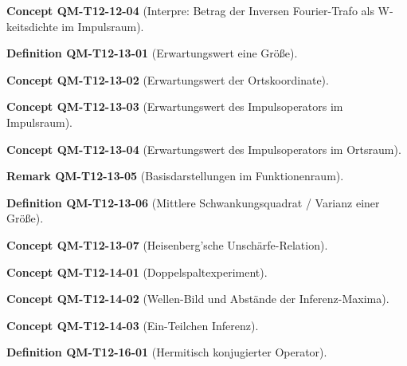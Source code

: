 \documentclass[10pt, letterpaper]{article}
\newcommand{\CustomHeading}[3]{%
  \par\medskip\noindent%
  \textbf{#1 #2} \textnormal{(#3)}.\enskip%
}
\newenvironment{DEF}[2]{\CustomHeading{Definition}{#1}{#2}}{}
\newenvironment{REM}[2]{\CustomHeading{Remark}{#1}{#2}}{}
\newenvironment{CONC}[2]{\CustomHeading{Concept}{#1}{#2}}{}
\begin{document}
\begin{CONC}{QM-T12-12-04}{Interpre: Betrag der Inversen Fourier-Trafo als W-keitsdichte im Impulsraum}
\end{CONC}

\begin{DEF}{QM-T12-13-01}{Erwartungswert eine Größe}
\end{DEF}

\begin{CONC}{QM-T12-13-02}{Erwartungswert der Ortskoordinate}
\end{CONC}

\begin{CONC}{QM-T12-13-03}{Erwartungswert des Impulsoperators im Impulsraum}
\end{CONC}

\begin{CONC}{QM-T12-13-04}{Erwartungswert des Impulsoperators im Ortsraum}
\end{CONC}

\begin{REM}{QM-T12-13-05}{Basisdarstellungen im Funktionenraum}
\end{REM}

\begin{DEF}{QM-T12-13-06}{Mittlere Schwankungsquadrat / Varianz einer Größe}
\end{DEF}

\begin{CONC}{QM-T12-13-07}{Heisenberg'sche Unschärfe-Relation}
\end{CONC}

\begin{CONC}{QM-T12-14-01}{Doppelspaltexperiment}
\end{CONC}

\begin{CONC}{QM-T12-14-02}{Wellen-Bild und Abstände der Inferenz-Maxima}
\end{CONC}

\begin{CONC}{QM-T12-14-03}{Ein-Teilchen Inferenz}
\end{CONC}

\begin{DEF}{QM-T12-16-01}{Hermitisch konjugierter Operator}
\end{DEF}
\end{document}
